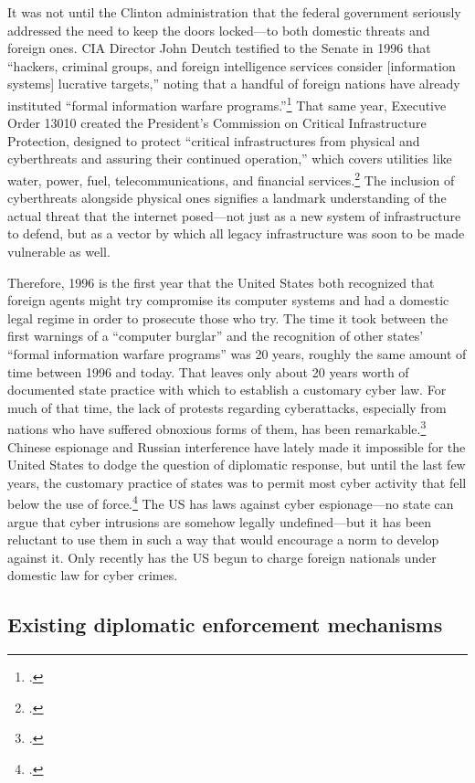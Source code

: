 \documentclass{memoir}
\begin{document}
\begin{refsegment}
It was not until the Clinton administration that the federal government seriously addressed the need to keep the doors locked---to both domestic threats and foreign ones. CIA Director John Deutch testified to the Senate in 1996 that ``hackers, criminal groups, and foreign intelligence services consider [information systems] lucrative targets,'' noting that a handful of foreign nations have already instituted ``formal information warfare programs.''\footcite{deutch_worldwide_1996} That same year, Executive Order 13010 created the President's Commission on Critical Infrastructure Protection, designed to protect ``critical infrastructures from physical and cyberthreats and assuring their continued operation,'' which covers utilities like water, power, fuel, telecommunications, and financial services.\footcite[~p.761]{boys_clinton_2018} The inclusion of cyberthreats alongside physical ones signifies a landmark understanding of the actual threat that the internet posed---not just as a new system of infrastructure to defend, but as a vector by which all legacy infrastructure was soon to be made vulnerable as well.

Therefore, 1996 is the first year that the United States both recognized that foreign agents might try compromise its computer systems and had a domestic legal regime in order to prosecute those who try. The time it took between the first warnings of a ``computer burglar'' and the recognition of other states' ``formal information warfare programs'' was 20 years, roughly the same amount of time between 1996 and today. That leaves only about 20 years worth of documented state practice with which to establish a customary cyber law. For much of that time, the lack of protests regarding cyberattacks, especially from nations who have suffered obnoxious forms of them, has been remarkable.\footcite[p.~132]{brown_customary_2012} Chinese espionage and Russian interference have lately made it impossible for the United States to dodge the question of diplomatic response, but until the last few years, the customary practice of states was to permit most cyber activity that fell below the use of force.\footcite[p.~141]{brown_customary_2012} The US has laws against cyber espionage---no state can argue that cyber intrusions are somehow legally undefined---but it has been reluctant to use them in such a way that would encourage a norm to develop against it. Only recently has the US begun to charge foreign nationals under domestic law for cyber crimes.

\subsection{Existing diplomatic enforcement mechanisms}


\end{refsegment}
\end{document}
